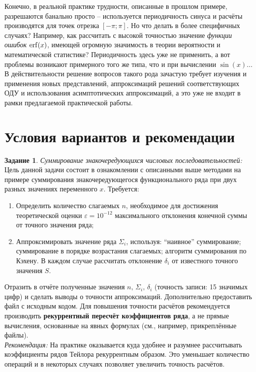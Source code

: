 \documentclass{article}
\theoremstyle{definition}
\newtheorem{task}{Задание}
\begin{document}
Конечно, в реальной практике трудности, описанные в прошлом примере, разрешаются банально просто -- используется периодичность синуса и расчёты производятся для точек отрезка $[-\pi;\pi]$. Но что делать в более специфичных случаях? Например, как рассчитать с высокой точностью значение \textit{функции ошибок} $\erf(x)$, имеющей огромную значимость в теории вероятности и математической статистике? Периодичность здесь уже не применить, а вот проблемы возникают примерного того же типа, что и при вычислении $\sin(x)$... В действительности решение вопросов такого рода зачастую требует изучения и применения новых представлений, аппроксимаций решений соответствующих ОДУ и использования асимптотических аппроксимаций, а это уже не входит в рамки предлагаемой практической работы.
\section{Условия вариантов и рекомендации}
\begin{task}
\textit{Суммирование знакочередующихся числовых последовательностей:} \\
Цель данной задачи состоит в ознакомлении с описанными выше методами на примере суммирования знакочередующегося функционального ряда при двух разных значениях переменного $x$. Требуется:
\begin{enumerate}
\item Определить количество слагаемых $n$, необходимое для достижения теоретической оценки $\varepsilon=10^{-12}$ максимального отклонения конечной суммы от точного значения ряда;
\item Аппроксимировать значение ряда $\Sigma_i$, используя: ``наивное'' суммирование; суммирование в порядке возрастания слагаемых; алгоритм суммирования по Кэхену. В каждом случае рассчитать отклонение $\delta_i$ от известного точного значения $S$.
\end{enumerate}
Отразить в отчёте полученные значения $n,\, \Sigma_i,\, \delta_i$ (точность записи: 15 значимых цифр) и сделать выводы о точности аппроксимаций. Дополнительно предоставить файл с исходным кодом. Для повышения точности расчётов рекомендуется производить \textbf{рекуррентный пересчёт коэффициентов ряда}, а не прямые вычисления, основанные на явных формулах (см., например, прикреплённые файлы). \\[4pt]
\textit{Рекомендация:} На практике оказывается куда удобнее и разумнее рассчитывать коэффициенты рядов Тейлора рекуррентным образом. Это уменьшает количество операций и в некоторых случаях позволяет увеличить точность расчётов.
\end{task}
\end{document}
